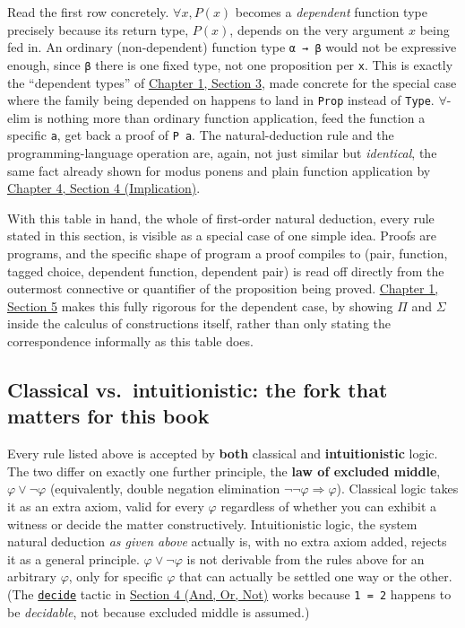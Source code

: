 Read the first row concretely. \(\forall x, P(x)\) becomes a \emph{dependent} function type precisely because its return type, \(P(x)\), depends on the very argument \(x\) being fed in. An ordinary (non-dependent) function type \texttt{α → β} would not be expressive enough, since \texttt{β} there is one fixed type, not one proposition per \texttt{x}. This is exactly the ``dependent types'' of \hyperref[sec:01-basics:03-dependent-types:1]{Chapter 1, Section 3}, made concrete for the special case where the family being depended on happens to land in \texttt{Prop} instead of \texttt{Type}. \(\forall\)-elim is nothing more than ordinary function application, feed the function a specific \texttt{a}, get back a proof of \texttt{P a}. The natural-deduction rule and the programming-language operation are, again, not just similar but \emph{identical}, the same fact already shown for modus ponens and plain function application by \hyperref[sec:04-propositions-and-proofs:04-implication:1]{Chapter 4, Section 4 (Implication)}.

With this table in hand, the whole of first-order natural deduction, every rule stated in this section, is visible as a special case of one simple idea. Proofs are programs, and the specific shape of program a proof compiles to (pair, function, tagged choice, dependent function, dependent pair) is read off directly from the outermost connective or quantifier of the proposition being proved. \hyperref[sec:02-terminology-and-coc:02-pi-sigma-and-coc:1]{Chapter 1, Section 5} makes this fully rigorous for the dependent case, by showing \(\Pi\) and \(\Sigma\) inside the calculus of constructions itself, rather than only stating the correspondence informally as this table does.

\subsection{Classical vs.~intuitionistic: the fork that matters for this book}\label{sec:04-propositions-and-proofs:02-logic-recap:7}

Every rule listed above is accepted by \textbf{both} classical and \textbf{intuitionistic} logic. The two differ on exactly one further principle, the \textbf{law of excluded middle}, \(\varphi \vee \neg\varphi\) (equivalently, double negation elimination \(\neg\neg\varphi \Rightarrow \varphi\)). Classical logic takes it as an extra axiom, valid for every \(\varphi\) regardless of whether you can exhibit a witness or decide the matter constructively. Intuitionistic logic, the system natural deduction \emph{as given above} actually is, with no extra axiom added, rejects it as a general principle. \(\varphi \vee \neg\varphi\) is not derivable from the rules above for an arbitrary \(\varphi\), only for specific \(\varphi\) that can actually be settled one way or the other. (The \href{https://lean-lang.org/doc/reference/latest/Tactic-Proofs/Tactic-Reference/}{\texttt{decide}} tactic in \hyperref[sec:04-propositions-and-proofs:05-and-or-not:1]{Section 4 (And, Or, Not)} works because \texttt{1 = 2} happens to be \emph{decidable}, not because excluded middle is assumed.)

